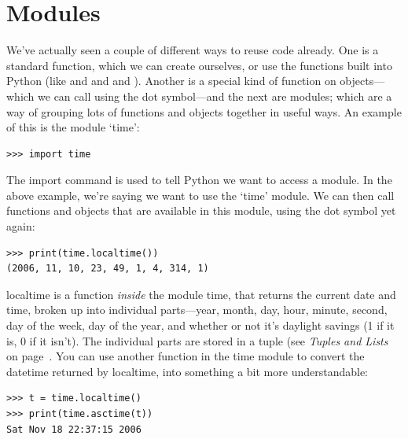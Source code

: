 \section{Modules}

We've actually seen a couple of different ways to reuse code already. One is a standard function, which we can create ourselves, or use the functions built into Python (like  and  and  and ). Another is a special kind of function on objects---which we can call using the dot symbol---and the next are modules; which are a way of grouping lots of functions and objects together in useful ways. An example of this is the module `time':

\begin{listing}
\begin{verbatim}
>>> import time
\end{verbatim}
\end{listing}

The import command is used to tell Python we want to access a module.  In the above example, we're saying we want to use the `time' module. We can then call functions and objects that are available in this module, using the dot symbol yet again:

\begin{listingignore}
\begin{verbatim}
>>> print(time.localtime())
(2006, 11, 10, 23, 49, 1, 4, 314, 1)
\end{verbatim}
\end{listingignore}

localtime is a function \emph{inside} the module time, that returns the current date and time, broken up into individual parts---year, month, day, hour, minute, second, day of the week, day of the year, and whether or not it's daylight savings (1 if it is, 0 if it isn't).  The individual parts are stored in a tuple (see \emph{Tuples and Lists} on page~\pageref{tuplesandlists}.  You can use another function in the time module to convert the datetime returned by localtime, into something a bit more understandable:

\begin{listingignore}
\begin{verbatim}
>>> t = time.localtime()
>>> print(time.asctime(t))
Sat Nov 18 22:37:15 2006
\end{verbatim}
\end{listingignore}

